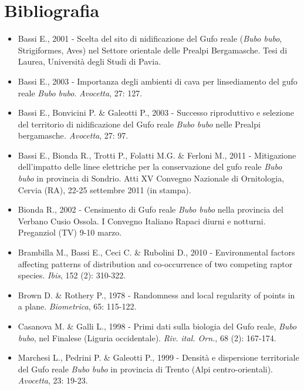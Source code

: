 \section*{Bibliografia}
\begin{itemize}\itemsep0pt
	\item Bassi E., 2001 - Scelta del sito di nidificazione del Gufo reale
(\textit{Bubo bubo}, Strigiformes, Aves) nel Settore orientale delle
Prealpi Bergamasche. Tesi di Laurea, Universit\`a degli Studi di Pavia.

	\item Bassi E., 2003 - Importanza degli ambienti di cava per
l{\textquotesingle}insediamento del gufo reale \textit{Bubo bubo}.
\textit{Avocetta}, 27: 127.

	\item Bassi E., Bonvicini P. \& Galeotti P., 2003 - Successo riproduttivo e
selezione del territorio di nidificazione del Gufo reale \textit{Bubo
bubo} nelle Prealpi bergamasche\textit{. Avocetta}, 27: 97.

	\item Bassi E., Bionda R., Trotti P., Folatti M.G. \& Ferloni M., 2011 -
Mitigazione dell{\textquoteright}impatto delle linee elettriche per la
conservazione del gufo reale \textit{Bubo bubo} in provincia di
Sondrio. Atti XV Convegno Nazionale di Ornitologia, Cervia (RA), 22-25
settembre 2011 (in stampa).

	\item Bionda R., 2002 - Censimento di Gufo reale \textit{Bubo bubo} nella
provincia del Verbano Cusio Ossola. I Convegno Italiano Rapaci diurni e
notturni. Preganziol (TV) 9-10 marzo.

	\item Brambilla M., Bassi E., Ceci C. \& Rubolini D., 2010 - Environmental
factors affecting patterns of distribution and co-occurrence of two
competing raptor species. \textit{Ibis}, 152 (2): 310-322.

	\item Brown D. \& Rothery P., 1978 - Randomness and local regularity of points
in a plane. \textit{Biometrica}, 65: 115-122.

	\item Casanova M. \& Galli L., 1998 - Primi dati sulla biologia del Gufo
reale, \textit{Bubo bubo}, nel Finalese (Liguria occidentale).
\textit{Riv. ital. Orn.}, 68 (2): 167-174.

	\item Marchesi L., Pedrini P. \& Galeotti P., 1999 - Densit\`a e dispersione
territoriale del Gufo reale \textit{Bubo bubo} in provincia di Trento
(Alpi centro-orientali). \textit{Avocetta}, 23: 19-23.


\end{itemize}
